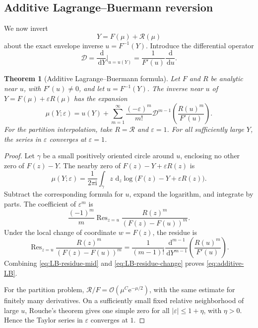 \documentclass[11pt]{article}
\numberwithin{equation}{section}
\theoremstyle{mainthm}
\newtheorem{theorem}{Theorem}[section]
\theoremstyle{defstyle}
\theoremstyle{remark}
\newcommand{\e}{\mathrm e}
\newcommand{\ii}{\mathrm i}
\newcommand{\dd}{\,\mathrm d}
\newcommand{\cO}{\mathcal O}
\newcommand{\Res}{\operatorname{Res}}
\newcommand{\Rtail}{\mathcal R}
\newcommand{\Dop}{\mathscr D}
\begin{document}
\subsection{Additive Lagrange--Buermann reversion}

We now invert
\begin{equation}\label{eq:full-inverse-equation}
 Y=F(\mu)+\Rtail(\mu)
\end{equation}
about the exact envelope inverse \(u=F^{-1}(Y)\).  Introduce the differential operator
\begin{equation}\label{eq:Dop-def}
 \Dop=\frac{\dd}{\dd Y}\bigg|_{u=u(Y)}
 =\frac1{F'(u)}\frac{\dd}{\dd u}.
\end{equation}

\begin{theorem}[Additive Lagrange--Buermann formula]\label{thm:additive-LB}
Let \(F\) and \(R\) be analytic near \(u\), with \(F'(u)\ne0\), and let \(u=F^{-1}(Y)\).  The inverse near \(u\) of
\(
 Y=F(\mu)+\varepsilon R(\mu)
\)
has the expansion
\begin{equation}\label{eq:additive-LB}
 \boxed{
 \mu(Y;\varepsilon)=u(Y)+
 \sum_{m=1}^{\infty}\frac{(-\varepsilon)^m}{m!}
 \Dop^{m-1}\!\left(\frac{R(u)^m}{F'(u)}\right).}
\end{equation}
For the partition interpolation, take \(R=\Rtail\) and \(\varepsilon=1\).  For all sufficiently large \(Y\), the series in \(\varepsilon\) converges at \(\varepsilon=1\).
\end{theorem}

\begin{proof}
Let \(\gamma\) be a small positively oriented circle around \(u\), enclosing no other zero of \(F(z)-Y\).  The nearby zero of
\(
 F(z)-Y+\varepsilon R(z)
\)
is
\[
 \mu(Y;\varepsilon)=\frac{1}{2\pi\ii}
 \int_\gamma z\,\dd_z\log\bigl(F(z)-Y+\varepsilon R(z)\bigr).
\]
Subtract the corresponding formula for \(u\), expand the logarithm, and integrate by parts.  The coefficient of \(\varepsilon^m\) is
\begin{equation}\label{eq:LB-residue-mid}
 \frac{(-1)^m}{m}\Res_{z=u}
 \frac{R(z)^m}{(F(z)-F(u))^m}.
\end{equation}
Under the local change of coordinate \(w=F(z)\), the residue is
\begin{equation}\label{eq:LB-residue-change}
 \Res_{z=u}\frac{R(z)^m}{(F(z)-F(u))^m}
 =\frac1{(m-1)!}
 \frac{\dd^{m-1}}{\dd Y^{m-1}}
 \left(\frac{R(u)^m}{F'(u)}\right).
\end{equation}
Combining \eqref{eq:LB-residue-mid} and \eqref{eq:LB-residue-change} proves \eqref{eq:additive-LB}.

For the partition problem, \(\Rtail/F=\cO(\mu^C\e^{-\mu/2})\), with the same estimate for finitely many derivatives.  On a sufficiently small fixed relative neighborhood of large \(u\), Rouche's theorem gives one simple zero for all \(|\varepsilon|\le1+\eta\), with \(\eta>0\).  Hence the Taylor series in \(\varepsilon\) converges at \(1\).
\end{proof}
\end{document}
